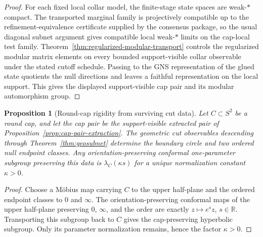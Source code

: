 \documentclass[11pt]{article}
\newtheorem{proposition}[theorem]{Proposition}
\begin{document}
\begin{proof}
For each fixed local collar model, the finite-stage state spaces are weak-\(*\) compact. The transported marginal family is projectively compatible up to the refinement-equivalence certificate supplied by the consensus package, so the usual diagonal subnet argument gives compatible local weak-\(*\) limits on the cap-local test family. Theorem~\ref{thm:regularized-modular-transport} controls the regularized modular matrix elements on every bounded support-visible collar observable under the stated cutoff schedule. Passing to the GNS representation of the glued state quotients the null directions and leaves a faithful representation on the local support. This gives the displayed support-visible cap pair and its modular automorphism group.
\end{proof}

\begin{proposition}[Round-cap rigidity from surviving cut data]\label{prop:round-cap-rigidity}
Let \(C\subset S^2\) be a round cap, and let the cap pair be the support-visible extracted pair of Proposition~\ref{prop:cap-pair-extraction}. The geometric cut observables descending through Theorem~\ref{thm:geosubnet} determine the boundary circle and two ordered null endpoint classes. Any orientation-preserving conformal one-parameter subgroup preserving this data is \(\lambda_C(\kappa s)\) for a unique normalization constant \(\kappa>0\).
\end{proposition}

\begin{proof}
Choose a M\"obius map carrying \(C\) to the upper half-plane and the ordered endpoint classes to \(0\) and \(\infty\). The orientation-preserving conformal maps of the upper half-plane preserving \(0\), \(\infty\), and the order are exactly \(z\mapsto e^s z\), \(s\in\mathbb R\). Transporting this subgroup back to \(C\) gives the cap-preserving hyperbolic subgroup. Only its parameter normalization remains, hence the factor \(\kappa>0\).
\end{proof}
\end{document}
